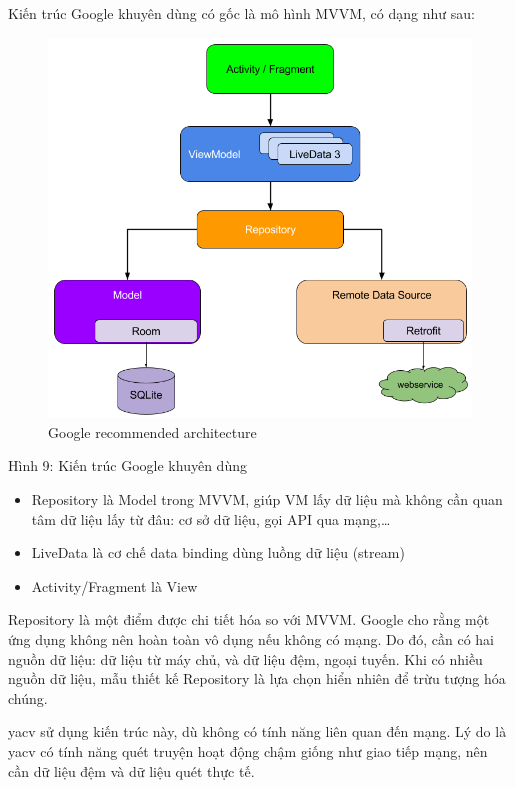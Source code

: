 Kiến trúc Google khuyên dùng có gốc là mô hình MVVM, có dạng như sau:

\begin{figure}
  \centering
  \includegraphics{../images/final-architecture.png}
  \caption{Google recommended architecture}
\end{figure}

Hình 9: Kiến trúc Google khuyên dùng

\begin{itemize}
  
  \item
        Repository là Model trong MVVM, giúp VM lấy dữ liệu mà không cần quan
        tâm dữ liệu lấy từ đâu: cơ sở dữ liệu, gọi API qua mạng,\ldots{}
  \item
        LiveData là cơ chế data binding dùng luồng dữ liệu (stream)
  \item
        Activity/Fragment là View
\end{itemize}

Repository là một điểm được chi tiết hóa so với MVVM. Google cho rằng
một ứng dụng không nên hoàn toàn vô dụng nếu không có mạng. Do đó, cần
có hai nguồn dữ liệu: dữ liệu từ máy chủ, và dữ liệu đệm, ngoại tuyến.
Khi có nhiều nguồn dữ liệu, mẫu thiết kế Repository là lựa chọn hiển
nhiên để trừu tượng hóa chúng.

yacv sử dụng kiến trúc này, dù không có tính năng liên quan đến mạng. Lý
do là yacv có tính năng quét truyện hoạt động chậm giống như giao tiếp
mạng, nên cần dữ liệu đệm và dữ liệu quét thực tế.

